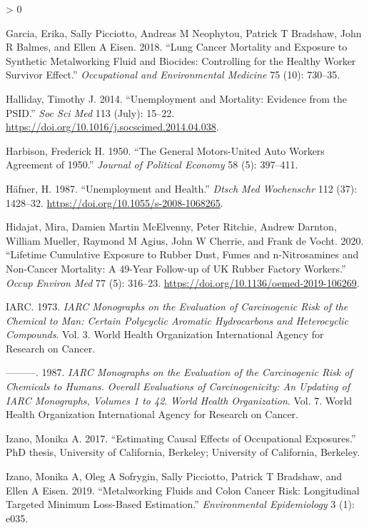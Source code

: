 \documentclass[
  11pt,
]{article}
\newlength{\cslhangindent}
\newenvironment{CSLReferences}[2] %
 {%
  \setlength{\parindent}{0pt}
  \ifodd #1 \everypar{\setlength{\hangindent}{\cslhangindent}}\ignorespaces\fi
  \ifnum #2 > 0
  \setlength{\parskip}{#2\baselineskip}
  \fi
 }%
 {}
\begin{document}
\begin{CSLReferences}{1}{0}
\leavevmode\hypertarget{ref-Garcia_2018}{}%
Garcia, Erika, Sally Picciotto, Andreas M Neophytou, Patrick T Bradshaw,
John R Balmes, and Ellen A Eisen. 2018. {``Lung Cancer Mortality and
Exposure to Synthetic Metalworking Fluid and Biocides: Controlling for
the Healthy Worker Survivor Effect.''} \emph{Occupational and
Environmental Medicine} 75 (10): 730--35.

\leavevmode\hypertarget{ref-Halliday_2014}{}%
Halliday, Timothy J. 2014. {``Unemployment and Mortality: Evidence from
the PSID.''} \emph{Soc Sci Med} 113 (July): 15--22.
\url{https://doi.org/10.1016/j.socscimed.2014.04.038}.

\leavevmode\hypertarget{ref-Harbison_1950}{}%
Harbison, Frederick H. 1950. {``The General Motors-United Auto Workers
Agreement of 1950.''} \emph{Journal of Political Economy} 58 (5):
397--411.

\leavevmode\hypertarget{ref-Hafner_1987}{}%
Häfner, H. 1987. {``Unemployment and Health.''} \emph{Dtsch Med
Wochenschr} 112 (37): 1428--32.
\url{https://doi.org/10.1055/s-2008-1068265}.

\leavevmode\hypertarget{ref-Hidajat_2020}{}%
Hidajat, Mira, Damien Martin McElvenny, Peter Ritchie, Andrew Darnton,
William Mueller, Raymond M Agius, John W Cherrie, and Frank de Vocht.
2020. {``Lifetime Cumulative Exposure to Rubber Dust, Fumes and
n-Nitrosamines and Non-Cancer Mortality: A 49-Year Follow-up of UK
Rubber Factory Workers.''} \emph{Occup Environ Med} 77 (5): 316--23.
\url{https://doi.org/10.1136/oemed-2019-106269}.

\leavevmode\hypertarget{ref-IARC_1973}{}%
IARC. 1973. \emph{IARC Monographs on the Evaluation of Carcinogenic Risk
of the Chemical to Man: Certain Polycyclic Aromatic Hydrocarbons and
Heterocyclic Compounds}. Vol. 3. World Health Organization International
Agency for Research on Cancer.

\leavevmode\hypertarget{ref-IARC_1987}{}%
---------. 1987. \emph{IARC Monographs on the Evaluation of the
Carcinogenic Risk of Chemicals to Humans. Overall Evaluations of
Carcinogenicity: An Updating of IARC Monographs, Volumes 1 to 42}.
\emph{World Health Organization}. Vol. 7. World Health Organization
International Agency for Research on Cancer.

\leavevmode\hypertarget{ref-Izano_2017_thesis}{}%
Izano, Monika A. 2017. {``Estimating Causal Effects of Occupational
Exposures.''} PhD thesis, University of California, Berkeley; University
of California, Berkeley.

\leavevmode\hypertarget{ref-Izano_2019}{}%
Izano, Monika A, Oleg A Sofrygin, Sally Picciotto, Patrick T Bradshaw,
and Ellen A Eisen. 2019. {``Metalworking Fluids and Colon Cancer Risk:
Longitudinal Targeted Minimum Loss-Based Estimation.''}
\emph{Environmental Epidemiology} 3 (1): e035.


\end{CSLReferences}
\end{document}
